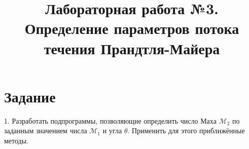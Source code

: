 \documentclass[12pt,a4paper,oneside]{book}
\title{Лабораторная работа №3. \\ Определение параметров потока течения Прандтля-Майера}
\author{}
\date{}
\newcommand*\Mach{\mathcal{M}}
\begin{document}
  
  \maketitle
  
  \section*{Задание}
  
  1. Разработать подпрограммы, позволяющие определить число Маха $\Mach_2$
  по заданным значением числа $\Mach_1$ и угла $\theta$. Применить для
  этого приближённые методы.
  
\end{document}
